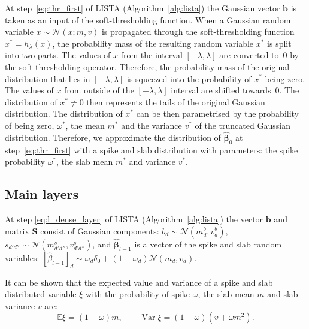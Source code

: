 \documentclass{article}
\newtheorem{lemma}{Lemma}
\begin{document}
  At step~\ref{eq:thr_first} of LISTA (Algorithm~\ref{alg:lista}) the Gaussian vector $\mathbf{b}$ is taken as an input of the soft-thresholding function. When a Gaussian random variable $x \sim \mathcal{N}(x; m, v)$ is propagated through the soft-thresholding function $x^* = h_{\lambda}(x)$, the probability mass of the resulting random variable $x^*$ is split into two parts. The values of $x$ from the interval $[-\lambda, \lambda]$ are converted to~$0$ by the soft-thresholding operator. Therefore, the probability mass of the original distribution that lies in $[-\lambda, \lambda]$ is squeezed into the probability of $x^*$ being zero. The values of $x$ from outside of the $[-\lambda, \lambda]$ interval are shifted towards~$0$. The distribution of $x^* \neq 0$ then represents the tails of the original Gaussian distribution. The distribution of $x^*$ can be then parametrised by the probability of being zero, $\omega^*$, the mean $m^*$ and the variance $v^*$ of the truncated Gaussian distribution.
 Therefore, we approximate the distribution of $\widehat{\boldsymbol\beta}_0$ at step~\ref{eq:thr_first} with a spike and slab distribution with parameters: the spike probability $\omega^*$, the slab mean $m^*$ and variance $v^*$.
  
  \subsection*{Main layers}
  At step \ref{eq:l_dense_layer} of LISTA (Algorithm~\ref{alg:lista}) the vector $\mathbf{b}$ and matrix $\mathbf{S}$ consist of Gaussian components: $b_d \sim \mathcal{N}(m^b_d, v^b_d)$, $s_{d'd''} \sim \mathcal{N}(m^s_{d'd''}, v^s_{d'd''})$, and $\widehat{\boldsymbol\beta}_{l-1}$ is a vector of the spike and slab random variables: $[\widehat{\beta}_{l-1}]_d \sim \omega_d \delta_0 + (1 - \omega_d)\mathcal{N}(m_d, v_d)$. 
  
 It can be shown that the expected value and variance of a spike and slab distributed variable $\xi$ with the probability of spike $\omega$, the slab mean $m$ and slab variance $v$ are:  
   \begin{equation}
   \label{eq:spsl_moments}
  \mathbb{E}\xi = (1-\omega)m, \qquad \operatorname{Var}\xi = (1-\omega)(v + \omega m^2).
  \end{equation}
  
\end{document}
